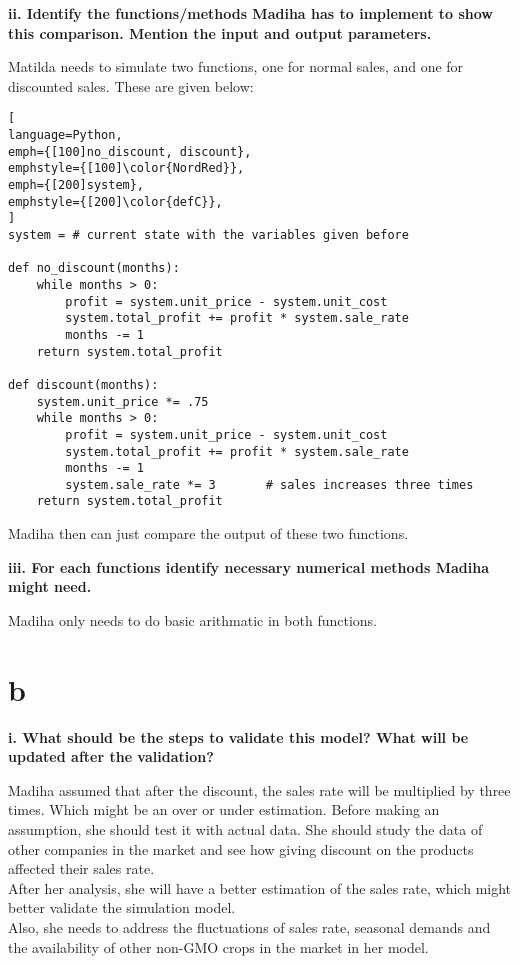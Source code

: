 \documentclass[article, 12pt, a4paper]{memoir}
\begin{document}
\textbf{ii. Identify the functions/methods Madiha has to implement to show this
comparison. Mention the input and output parameters.}
\vspace{1em}

\begin{solution}
    [a.ii]
    Matilda needs to simulate two functions, one for normal sales, and one for
    discounted sales. These are given below:

\begin{lstlisting}[
language=Python,
emph={[100]no_discount, discount},
emphstyle={[100]\color{NordRed}},
emph={[200]system},
emphstyle={[200]\color{defC}},
]
system = # current state with the variables given before

def no_discount(months):
    while months > 0:
        profit = system.unit_price - system.unit_cost
        system.total_profit += profit * system.sale_rate
        months -= 1
    return system.total_profit

def discount(months):
    system.unit_price *= .75
    while months > 0:
        profit = system.unit_price - system.unit_cost
        system.total_profit += profit * system.sale_rate
        months -= 1
        system.sale_rate *= 3       # sales increases three times
    return system.total_profit      
\end{lstlisting}

    Madiha then can just compare the output of these two functions.
\end{solution}


\textbf{iii. For each functions identify necessary numerical methods Madiha might need.}
\vspace{1em}

\begin{solution}
    [a.iii]
    Madiha only needs to do basic arithmatic in both functions.
\end{solution}


\section{b}

\textbf{i. What should be the steps to validate this model? What will be updated after the
validation?}
\vspace{1em}

\begin{solution}
    [b.i]
    Madiha assumed that after the discount, the sales rate will be multiplied by three
    times. Which might be an over or under estimation. Before making an assumption, she
    should test it with actual data. She should study the data of other companies in the
    market and see how giving discount on the products affected their sales rate.\\

    After her analysis, she will have a better estimation of the sales rate, which might
    better validate the simulation model.\\

    Also, she needs to address the fluctuations of sales rate, seasonal demands and the
    availability of other non-GMO crops in the market in her model.
\end{solution}
\end{document}
